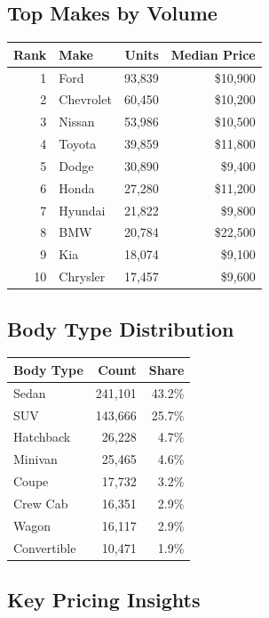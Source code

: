 \documentclass[12pt,a4paper]{article}
\begin{document}
\subsection{Top Makes by Volume}

\begin{center}
\begin{tabular}{rlrr}
\toprule
\textbf{Rank} & \textbf{Make} & \textbf{Units} & \textbf{Median Price} \\
\midrule
1 & Ford & 93,839 & \$10,900 \\
2 & Chevrolet & 60,450 & \$10,200 \\
3 & Nissan & 53,986 & \$10,500 \\
4 & Toyota & 39,859 & \$11,800 \\
5 & Dodge & 30,890 & \$9,400 \\
6 & Honda & 27,280 & \$11,200 \\
7 & Hyundai & 21,822 & \$9,800 \\
8 & BMW & 20,784 & \$22,500 \\
9 & Kia & 18,074 & \$9,100 \\
10 & Chrysler & 17,457 & \$9,600 \\
\bottomrule
\end{tabular}
\end{center}

\subsection{Body Type Distribution}

\begin{center}
\begin{tabular}{lrr}
\toprule
\textbf{Body Type} & \textbf{Count} & \textbf{Share} \\
\midrule
Sedan & 241,101 & 43.2\% \\
SUV & 143,666 & 25.7\% \\
Hatchback & 26,228 & 4.7\% \\
Minivan & 25,465 & 4.6\% \\
Coupe & 17,732 & 3.2\% \\
Crew Cab & 16,351 & 2.9\% \\
Wagon & 16,117 & 2.9\% \\
Convertible & 10,471 & 1.9\% \\
\bottomrule
\end{tabular}
\end{center}

\subsection{Key Pricing Insights}
\end{document}
